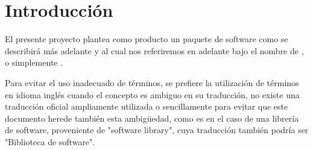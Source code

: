 \section{Introducción}

El presente proyecto plantea como producto un paquete de software como se describirá más adelante y al cual nos referiremos en adelante bajo el nombre de , o simplemente .

Para evitar el uso inadecuado de términos, se prefiere la utilización de
términos en idioma inglés cuando el concepto es ambiguo en su traducción, no
existe una traducción oficial ampliamente utilizada o sencillamente para evitar
que este documento herede también esta ambigüedad, como es en el caso de una
librería de software, proveniente de "software library", cuya traducción también
podría ser "Biblioteca de software".